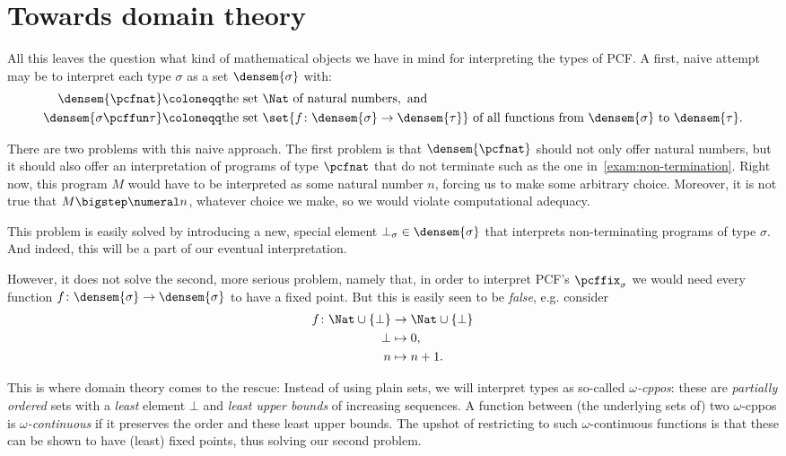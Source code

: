 \section{Towards domain theory}

All this leaves the question what kind of mathematical objects we have in mind
for interpreting the types of PCF. A first, naive attempt may be to interpret
each type \(\sigma\) as a set \(\densem{\sigma}\) with:
\begin{align*}
  \densem{\pcfnat} &\coloneqq \text{the set \(\Nat\) of natural numbers}, \text{ and} \\
  \densem{\sigma \pcffun \tau} &\coloneqq \text{the set \(\set{f \colon \densem{\sigma} \to
    \densem{\tau}}\) of all functions from \(\densem{\sigma}\) to \(\densem{\tau}\)}.
\end{align*}

There are two problems with this naive approach.
%
The first problem is that \(\densem{\pcfnat}\) should not only offer natural
numbers, but it should also offer an interpretation of programs of type
\(\pcfnat\) that do not terminate such as the one
in~\cref{exam:non-termination}.
%
Right now, this program \(M\) would have to be interpreted as some natural
number \(n\), forcing us to make some arbitrary choice. Moreover, it is not true
that \(M \bigstep \numeral n\), whatever choice we make, so we would violate
computational adequacy.

This problem is easily solved by introducing a new, special element
\(\bot_\sigma \in \densem{\sigma}\) that interprets non-terminating programs
of type \(\sigma\). And indeed, this will be a part of our eventual interpretation.

However, it does not solve the second, more serious problem, namely that, in
order to interpret PCF's \(\pcffix_\sigma\) we would need every function
\(f \colon \densem{\sigma} \to \densem{\sigma}\) to have a fixed point.
%
But this is easily seen to be \emph{false}, e.g. consider
\begin{align*}
  f \colon \Nat \cup \{\bot\} &\to \Nat \cup \{\bot\} \\
  \bot &\mapsto 0, \\
  n &\mapsto n+1.
\end{align*}

This is where domain theory comes to the rescue: Instead of using plain sets, we
will interpret types as so-called \emph{\(\omega\)-cppos}: these are
\emph{partially ordered} sets with a \emph{least} element \(\bot\) and
\emph{least upper bounds} of increasing sequences.
%
A function between (the underlying sets of) two \(\omega\)-cppos is
\emph{\(\omega\)-continuous} if it preserves the order and these least upper
bounds.
%
The upshot of restricting to such \(\omega\)-continuous functions is that these
can be shown to have (least) fixed points, thus solving our second problem.

